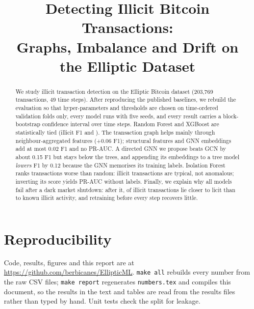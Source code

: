 \documentclass[conference]{IEEEtran}
\begin{document}
\title{Detecting Illicit Bitcoin Transactions:\\
Graphs, Imbalance and Drift on the Elliptic Dataset}

\author{
}

\maketitle

\begin{abstract}
We study illicit transaction detection on the Elliptic Bitcoin dataset (203,769
transactions, 49 time steps). After reproducing the published baselines, we
rebuild the evaluation so that hyper-parameters and thresholds are chosen on
time-ordered validation folds only, every model runs with five seeds, and every
result carries a block-bootstrap confidence interval over time steps. Random
Forest and XGBoost are statistically tied (illicit F1 \MainRFFone{} and
\MainXGBFone{}). The transaction graph helps mainly through neighbour-aggregated
features (+0.06 F1); structural features and GNN embeddings add at most 0.02 F1
and no PR-AUC. A directed GNN we propose beats GCN by about 0.15 F1 but stays below
the trees, and appending its embeddings to a tree model \emph{lowers} F1 by
0.12 because the GNN memorises its training labels. Isolation Forest ranks
transactions worse than random: illicit transactions are typical, not anomalous;
inverting its score yields PR-AUC \IFAFUnsupTypicalPRAUC{} without labels.
Finally, we explain why all models fail after a dark market shutdown: after it,
\NovelPost{} of illicit transactions lie closer to licit than to known illicit
activity, and retraining before every step recovers little.
\end{abstract}












\section*{Reproducibility}
Code, results, figures and this report are at
\url{https://github.com/berbicanes/EllipticML}. \texttt{make all} rebuilds every
number from the raw CSV files; \texttt{make report} regenerates
\texttt{numbers.tex} and compiles this document, so the results in the text and
tables are read from the results files rather than typed by hand. Unit tests
check the split for leakage.



\end{document}
